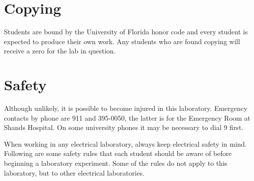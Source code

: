 \section{Copying}

Students are bound by the University of Florida honor code and every student is expected to produce their own work. Any students who are found copying will receive a zero for the lab in question.

\section{Safety}

Although unlikely, it is possible to become injured in this laboratory. Emergency contacts by phone are 911 and 395-0050, the latter is for the Emergency Room at Shands Hospital. On some university phones it may be necessary to dial 9 first.

When working in any electrical laboratory, always keep electrical safety in mind. Following are some safety rules that each student should be aware of before beginning a laboratory experiment. Some of the rules do not apply to this laboratory, but to other electrical laboratories.

